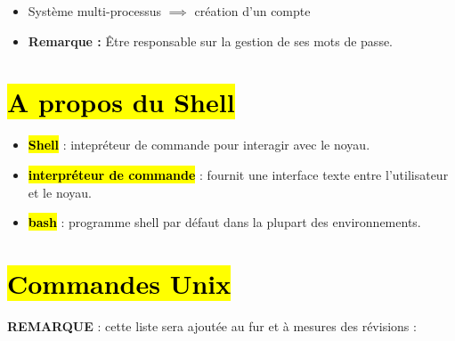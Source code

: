 \documentclass{article}
\begin{document}
\begin{itemize}
    \item Système multi-processus $ \implies $ création d'un compte
    \item \textbf{Remarque :} Être responsable sur la gestion de ses mots de passe.
\end{itemize}

\section*{\hl{A propos du Shell}}

\begin{itemize}
    \item {}\hl{\textbf{Shell}} : intepréteur de commande pour interagir avec le noyau.
    \item {}\hl{\textbf{interpréteur de commande}} : fournit une interface texte entre l'utilisateur et le noyau.
    \item {}\hl{\textbf{bash}} : programme shell par défaut dans la plupart des environnements. 
\end{itemize}

\section*{\hl{\textbf{Commandes Unix}}}

\textbf{REMARQUE} : cette liste sera ajoutée au fur et à mesures des révisions :
\end{document}
